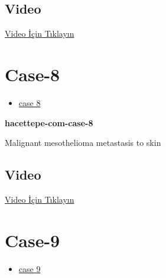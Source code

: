 \documentclass[
  letterpaper,
  DIV=11,
  numbers=noendperiod]{scrreprt}
\providecommand{\tightlist}{%
  \setlength{\itemsep}{0pt}\setlength{\parskip}{0pt}}\usepackage{longtable,booktabs,array}
\begin{document}
\hypertarget{video-5}{%
\subsection{Video}\label{video-5}}

\href{https://www.youtube.com/watch?v=FU-Fv7kQPdE}{Video İçin Tıklayın}

\hypertarget{sec-hacettepe-case-of-the-month-case-8}{%
\section{Case-8}\label{sec-hacettepe-case-of-the-month-case-8}}

\begin{itemize}
\tightlist
\item
  \href{https://www.youtube.com/watch?v=c8pDBHRO7t8\&ab_channel=KemalKosemehmetoglu}{case
  8}
\end{itemize}

\textbf{hacettepe-com-case-8}

\begin{tcolorbox}[enhanced jigsaw, left=2mm, toprule=.15mm, rightrule=.15mm, bottomrule=.15mm, leftrule=.75mm, colback=white, colframe=quarto-callout-tip-color-frame, toptitle=1mm, breakable, titlerule=0mm, colbacktitle=quarto-callout-tip-color!10!white, bottomtitle=1mm, title=\textcolor{quarto-callout-tip-color}{\faLightbulb}\hspace{0.5em}{Tanı}, arc=.35mm, opacitybacktitle=0.6, opacityback=0, coltitle=black]

Malignant mesothelioma metastasis to skin

\end{tcolorbox}

\hypertarget{video-6}{%
\subsection{Video}\label{video-6}}

\href{https://www.youtube.com/watch?v=c8pDBHRO7t8}{Video İçin Tıklayın}

\hypertarget{sec-hacettepe-case-of-the-month-case-9}{%
\section{Case-9}\label{sec-hacettepe-case-of-the-month-case-9}}

\begin{itemize}
\tightlist
\item
  \href{https://www.youtube.com/watch?v=9OxpsDNCHWk\&ab_channel=KemalKosemehmetoglu}{case
  9}
\end{itemize}
\end{document}
